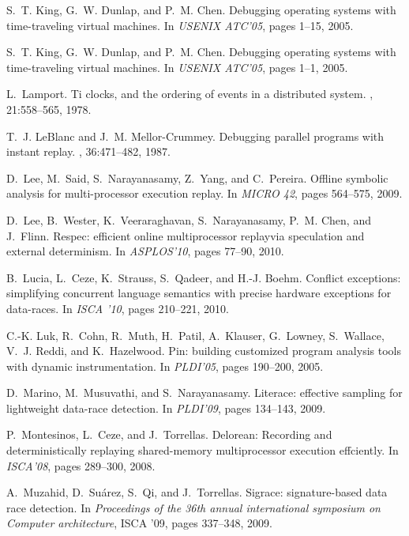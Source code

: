 \documentclass[10pt,onecolumn,letterpaper]{article}
\begin{document}
{\begin{thebibliography}{10}
S.~T. King, G.~W. Dunlap, and P.~M. Chen.
\newblock Debugging operating systems with time-traveling virtual machines.
\newblock In {\em USENIX ATC'05}, pages 1--15, 2005.

S.~T. King, G.~W. Dunlap, and P.~M. Chen.
\newblock Debugging operating systems with time-traveling virtual machines.
\newblock In {\em USENIX ATC'05}, pages 1--1, 2005.

L.~Lamport.
\newblock Ti clocks, and the ordering of events in a distributed system.
, 21:558--565, 1978.

T.~J. LeBlanc and J.~M. Mellor-Crummey.
\newblock Debugging parallel programs with instant replay.
, 36:471--482, 1987.

D.~Lee, M.~Said, S.~Narayanasamy, Z.~Yang, and C.~Pereira.
\newblock Offline symbolic analysis for multi-processor execution replay.
\newblock In {\em MICRO 42}, pages 564--575, 2009.

D.~Lee, B.~Wester, K.~Veeraraghavan, S.~Narayanasamy, P.~M. Chen,
and J.~Flinn.
\newblock Respec: efficient online multiprocessor replayvia speculation and
  external determinism.
\newblock In {\em ASPLOS'10}, pages 77--90, 2010.

B.~Lucia, L.~Ceze, K.~Strauss, S.~Qadeer, and H.-J. Boehm.
\newblock Conflict exceptions: simplifying concurrent language semantics with
  precise hardware exceptions for data-races.
\newblock In {\em ISCA '10}, pages 210--221, 2010.

C.-K. Luk, R.~Cohn, R.~Muth, H.~Patil, A.~Klauser, G.~Lowney,
S.~Wallace, V.~J.
  Reddi, and K.~Hazelwood.
\newblock Pin: building customized program analysis tools with dynamic
  instrumentation.
\newblock In {\em PLDI'05}, pages 190--200, 2005.

D.~Marino, M.~Musuvathi, and S.~Narayanasamy.
\newblock Literace: effective sampling for lightweight data-race detection.
\newblock In {\em PLDI'09}, pages 134--143, 2009.

P.~Montesinos, L.~Ceze, and J.~Torrellas.
\newblock Delorean: Recording and deterministically replaying shared-memory
  multiprocessor execution effciently.
\newblock In {\em ISCA'08}, pages 289--300, 2008.

A.~Muzahid, D.~Su\'{a}rez, S.~Qi, and J.~Torrellas.
\newblock Sigrace: signature-based data race detection.
\newblock In {\em Proceedings of the 36th annual international symposium on
  Computer architecture}, ISCA '09, pages 337--348, 2009.


\end{thebibliography}}
\end{document}
